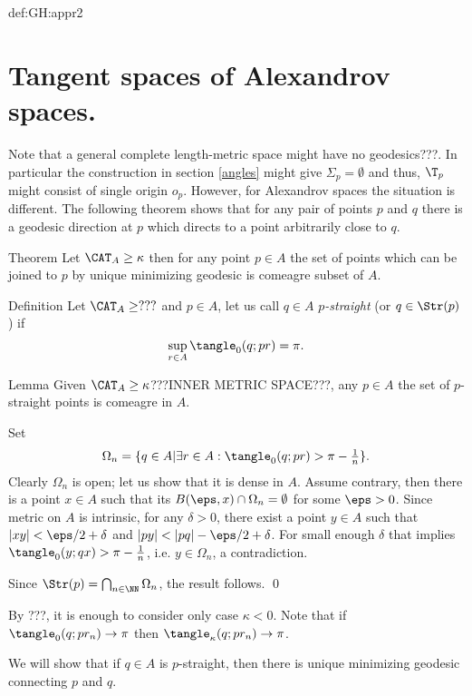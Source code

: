 {\begin{subthm}{def:GH:appr2}
\section{Tangent spaces of Alexandrov spaces.} 

Note that a general complete length-metric space might have no geodesics???.
In particular the construction in section \ref{angles} might give $\Sigma_p=\emptyset$ and thus, $\T_p$ might consist of single origin $o_p$.
However, for Alexandrov spaces the situation is different.
The following theorem shows that for any pair of points $p$ and $q$ there is a geodesic direction at $p$ which directs to a point arbitrarily close to $q$.

\begin{thm}{Theorem \cite[Th. 27]{plaut:survey}}
Let $\CAT_A\ge\kappa$ then for any point $p\in A$ the set of points which can be joined to $p$ by unique minimizing geodesic is comeagre subset of $A$.
\end{thm}

\begin{thm}{Definition}
Let $\CAT_A\ge???$ and $p\in A$, let us call $q\in A$ \emph{$p$-straight} (or $q\in \Str(p)$) if
$$\sup_{r\in A}\tangle_0(q;p r)=\pi.$$
\end{thm}

\begin{thm}{Lemma}
Given $\CAT_A\ge\kappa$???INNER METRIC SPACE???, any $p\in A$ the set of $p$-straight points is comeagre in $A$.
\end{thm}

Set 
$$\Omega_n=\{q\in A|\exists r\in A: \tangle_0 (q;p r)>\pi-\tfrac1n\}.$$
Clearly $\Omega_n$ is open; 
let us show that it is dense in $A$.
Assume contrary, then there is a point $x\in A$ such that its $B(\eps,x)\cap \Omega_n=\emptyset$ for some $\eps>0$.
Since metric on $A$ is intrinsic, for any $\delta>0$, there exist a point $y\in A$ such that $|x y|<\eps/2+\delta$ and $|p y|<|p q|-\eps/2+\delta$. 
For small enough $\delta$ that implies $\tangle_0 (y;q x)>\pi-\tfrac1n$, i.e. $y\in\Omega_n$, a contradiction.

Since $\Str(p)=\bigcap_{n\in \NN}\Omega_n$, the result follows.
\qed

By ???, it is enough to consider only case $\kappa<0$.
Note that if $\tangle_0(q;pr_n)\to\pi$ then  $\tangle_{\kappa}(q;pr_n)\to\pi$.

We will show that if $q\in A$ is $p$-straight, then there is unique minimizing geodesic connecting $p$ and $q$.


\end{subthm}}
